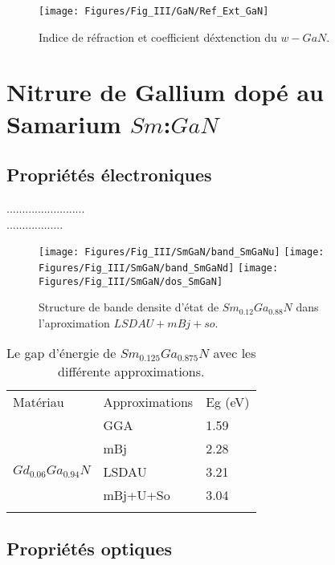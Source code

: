 \begin{figure}[h!]
	\centering
	\texttt{[image: Figures/Fig\_III/GaN/Ref\_Ext\_GaN]}
	\caption{Indice de réfraction et coefficient déxtenction du $w-GaN$.}
	\label{fig:refextgan}
\end{figure}
\FloatBarrier
\section{Nitrure de Gallium dopé au Samarium $ Sm $:$ GaN $}

\subsection{Propriétés électroniques}
.........................\\

..................

\begin{figure}[h]
	\centering
	\texttt{[image: Figures/Fig\_III/SmGaN/band\_SmGaNu]}
	\texttt{[image: Figures/Fig\_III/SmGaN/band\_SmGaNd]}
	\texttt{[image: Figures/Fig\_III/SmGaN/dos\_SmGaN]}
	\caption{Structure de bande densite d'état de $ Sm_{0.12}Ga_{0.88}N $ dans l'aproximation $ LSDAU+mBj+so $.}
	\label{fig:bandup_dos_SmGaN}
\end{figure}
\begin{table}[h]
	\centering
	\begin{tabular}{lll}
		\hline\noalign{\smallskip}
		Matériau & Approximations & Eg (eV)  \\
		\noalign{\smallskip}\hline\noalign{\smallskip}
		& GGA & 1.59  \\
		& mBj & 2.28  \\  
		$ Gd_{0.06}Ga_{0.94}N $ & LSDAU & 3.21\\
		& mBj+U+So & 3.04 \\
		\noalign{\smallskip}\hline
	\end{tabular}
	\caption{Le gap d'énergie de $ Sm_{0.125}Ga_{0.875}N $ avec les  différente  approximations.}
	\label{tab_GdGaN}
\end{table}
\FloatBarrier

\subsection{Propriétés optiques}

